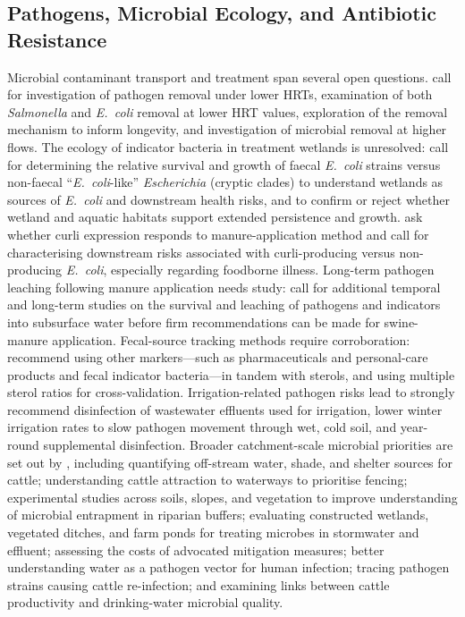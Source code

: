 \subsection{Pathogens, Microbial Ecology, and Antibiotic Resistance}
Microbial contaminant transport and treatment span several open questions. \textcite{Soupir2018} call for investigation of pathogen removal under lower HRTs, examination of both \textit{Salmonella} and \textit{E.\ coli} removal at lower HRT values, exploration of the removal mechanism to inform longevity, and investigation of microbial removal at higher flows. The ecology of indicator bacteria in treatment wetlands is unresolved: \textcite{Stott2023} call for determining the relative survival and growth of faecal \textit{E.\ coli} strains versus non-faecal ``\textit{E.\ coli}-like'' \textit{Escherichia} (cryptic clades) to understand wetlands as sources of \textit{E.\ coli} and downstream health risks, and to confirm or reject whether wetland and aquatic habitats support extended persistence and growth. \textcite{Truhlar2015} ask whether curli expression responds to manure-application method and call for characterising downstream risks associated with curli-producing versus non-producing \textit{E.\ coli}, especially regarding foodborne illness. Long-term pathogen leaching following manure application needs study: \textcite{Malik2004} call for additional temporal and long-term studies on the survival and leaching of pathogens and indicators into subsurface water before firm recommendations can be made for swine-manure application. Fecal-source tracking methods require corroboration: \textcite{Gottschall2013} recommend using other markers---such as pharmaceuticals and personal-care products and fecal indicator bacteria---in tandem with sterols, and using multiple sterol ratios for cross-validation. Irrigation-related pathogen risks lead \textcite{Ding2021} to strongly recommend disinfection of wastewater effluents used for irrigation, lower winter irrigation rates to slow pathogen movement through wet, cold soil, and year-round supplemental disinfection. Broader catchment-scale microbial priorities are set out by \textcite{Collins2007}, including quantifying off-stream water, shade, and shelter sources for cattle; understanding cattle attraction to waterways to prioritise fencing; experimental studies across soils, slopes, and vegetation to improve understanding of microbial entrapment in riparian buffers; evaluating constructed wetlands, vegetated ditches, and farm ponds for treating microbes in stormwater and effluent; assessing the costs of advocated mitigation measures; better understanding water as a pathogen vector for human infection; tracing pathogen strains causing cattle re-infection; and examining links between cattle productivity and drinking-water microbial quality.

